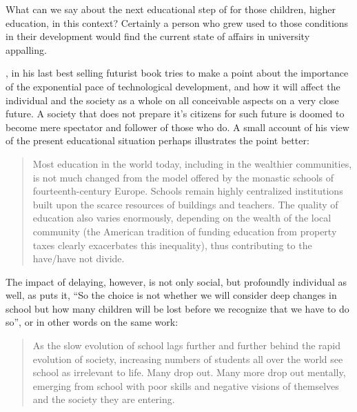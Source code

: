 What can we say about the next educational step of for those children, higher
education, in this context?
Certainly a person who grew used to those conditions in their development 
would find the current state of affairs in university appalling. 

\cite{futurism:kurzweil_singularity_is_near}, in his last best selling futurist
book tries to make a point about the importance of the exponential pace of
technological development, and how it will affect the individual and the
society as a whole on all conceivable aspects on a very close future.  A
society that does not prepare it's citizens for such future is doomed to become
mere spectator and follower of those who do. A small account of his view of the
present educational situation perhaps illustrates the point better:

\begin{quotation}
    Most education in the world today, including in the wealthier communities,
    is not much changed from the model offered by the monastic schools of
    fourteenth-century Europe. Schools remain highly centralized institutions
    built upon the scarce resources of buildings and teachers. The quality of
    education also varies enormously, depending on the wealth of the local
    community (the American tradition of funding education from property taxes
    clearly exacerbates this inequality), thus contributing to the have/have not
    divide.
\end{quotation}

The impact of delaying, however, is not only social, but profoundly individual as well, as
\cite{education:papert_gaston_vision_for_education} puts it, ``So the choice is
not whether we will consider deep changes in school but how many children will
be lost before we recognize that we have to do so'', or in other words on the
same work:
\begin{quotation}
    As the slow evolution of school lags further and further behind the rapid
    evolution of society, increasing numbers of students all over the world see
    school as irrelevant to life. Many drop out. Many more drop out mentally,
    emerging from school with poor skills and negative visions of themselves and the
    society they are entering.
\end{quotation}

